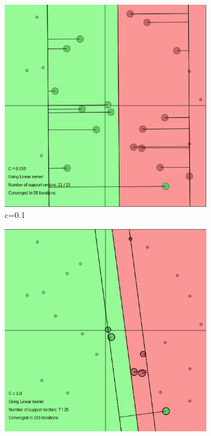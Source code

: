 \documentclass{article}
\begin{document}
\begin{figure}[]
        \begin{subfigure}{0.33\linewidth}
            \includegraphics[width=\linewidth]{svmc01}
            \caption{c=0.1}
        \end{subfigure}
        \begin{subfigure}{0.33\linewidth}
            \includegraphics[width=\linewidth]{svmc10}

\end{subfigure}
\end{figure}
\end{document}
